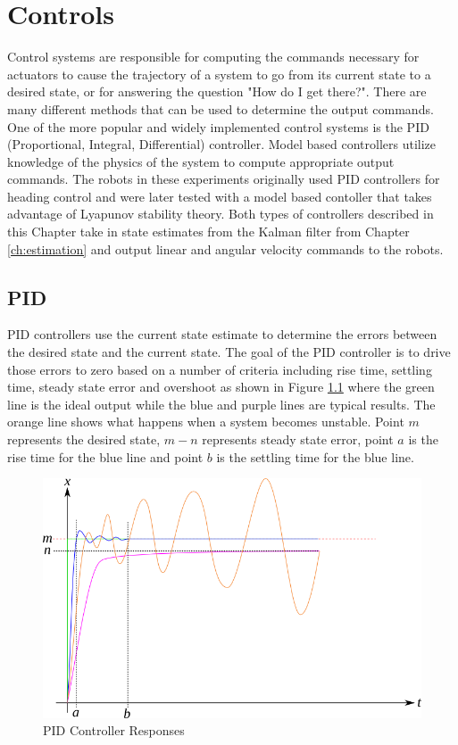 \chapter{Controls}
\label{ch:controls}
Control systems are responsible for computing the commands necessary for actuators to cause the trajectory of a system to go from its current state to a desired state, or for answering the question "How do I get there?". There are many different methods that can be used to determine the output commands. One of the more popular and widely implemented control systems is the PID (Proportional, Integral, Differential) controller. Model based controllers utilize knowledge of the physics of the system to compute appropriate output commands. The robots in these experiments originally used PID controllers for heading control and were later tested with a model based contoller that takes advantage of Lyapunov stability theory. Both types of controllers described in this Chapter take in state estimates from the Kalman filter from Chapter \ref{ch:estimation} and output linear and angular velocity commands to the robots.

\section{PID}
\label{sec:pid}
PID controllers use the current state estimate to determine the errors between the desired state and the current state. The goal of the PID controller is to drive those errors to zero based on a number of criteria including rise time, settling time, steady state error and overshoot as shown in Figure \ref{fig:pid} where the green line is the ideal output while the blue and purple lines are typical results. The orange line shows what happens when a system becomes unstable. Point $m$ represents the desired state, $m-n$ represents steady state error, point $a$ is the rise time for the blue line and point $b$ is the settling time for the blue line.

\begin{figure}[ht!]
	\centering
	\includegraphics[width=.85\textwidth]{images/pid}
	\caption{PID Controller Responses} 
	\label{fig:pid}
\end{figure}

